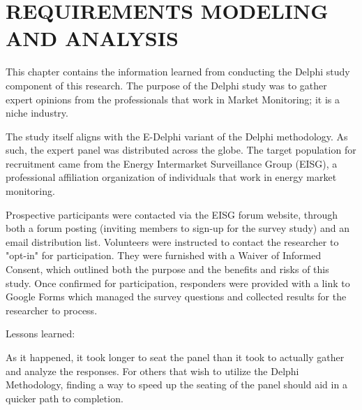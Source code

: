 %
%
%
%  
%

\chapter{\MakeUppercase{Requirements Modeling and Analysis}}
\label{cha:requirements}

This chapter contains the information learned from conducting the Delphi study component of this research. The purpose of the Delphi study was to gather expert opinions from the professionals that work in Market Monitoring; it is a niche industry.

The study itself aligns with the E-Delphi variant of the Delphi methodology. As such, the expert panel was distributed across the globe. The target population for recruitment came from the Energy Intermarket Surveillance Group (EISG), a professional affiliation organization of individuals that work in energy market monitoring.

Prospective participants were contacted via the EISG forum website, through both a forum posting (inviting members to sign-up for the survey study) and an email distribution list. Volunteers were instructed to contact the researcher to "opt-in" for participation. They were furnished with a Waiver of Informed Consent, which outlined both the purpose and the benefits and risks of this study. Once confirmed for participation, responders were provided with a link to Google Forms which managed the survey questions and collected results for the researcher to process.

Lessons learned: 

As it happened, it took longer to seat the panel than it took to actually gather and analyze the responses. For others that wish to utilize the Delphi Methodology, finding a way to speed up the seating of the panel should aid in a quicker path to completion.